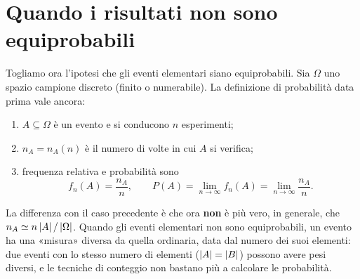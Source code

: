 \section{Quando i risultati non sono equiprobabili}

Togliamo ora l'ipotesi che gli eventi elementari siano equiprobabili. Sia $\Omega$ uno spazio campione discreto
(finito o numerabile). La definizione di probabilità data prima vale ancora:
\begin{enumerate}[label=\alph*)]
  \item $A \subseteq \Omega$ è un evento e si conducono $n$ esperimenti;
  \item $n_A = n_A(n)$ è il numero di volte in cui $A$ si verifica;
  \item frequenza relativa e probabilità sono
        \[ f_n(A) = \frac{n_A}{n} , \qquad P(A) = \lim_{n \to \infty} f_n(A) = \lim_{n \to \infty} \frac{n_A}{n} . \]
\end{enumerate}
La differenza con il caso precedente è che ora \textbf{non} è più vero, in generale, che
$n_A \simeq n \left\lvert A \right\rvert / \left\lvert \Omega \right\rvert$. Quando gli eventi elementari non sono equiprobabili, un evento ha una
«misura» diversa da quella ordinaria, data dal numero dei suoi elementi: due eventi con lo stesso numero di elementi
($\left\lvert A \right\rvert = \left\lvert B \right\rvert$) possono avere pesi diversi, e le tecniche di conteggio non bastano più a calcolare le
probabilità.

